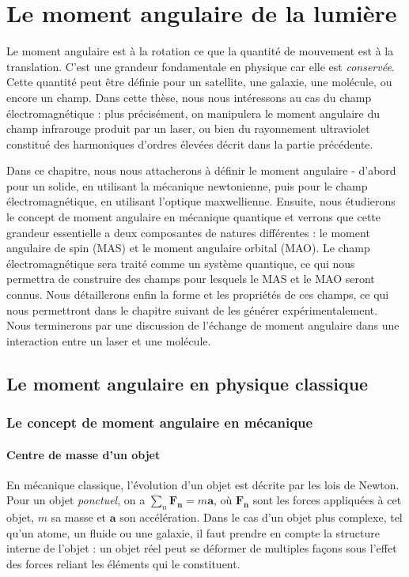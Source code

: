 \chapter{Le moment angulaire de la lumière}
\label{CH:LightAM}

Le moment angulaire est à la rotation ce que la quantité de mouvement est à la translation. C'est une grandeur fondamentale en physique car elle est \textit{conservée}. Cette quantité peut être définie pour un satellite, une galaxie, une molécule, ou encore un champ. Dans cette thèse, nous nous intéressons au cas du champ électromagnétique : plus précisément, on manipulera le moment angulaire du champ infrarouge produit par un laser, ou bien du rayonnement ultraviolet constitué des harmoniques d'ordres élevées décrit dans la partie précédente.\par
Dans ce chapitre, nous nous attacherons à définir le moment angulaire - d'abord pour un solide, en utilisant la mécanique newtonienne, puis pour le champ électromagnétique, en utilisant l'optique maxwellienne. Ensuite, nous étudierons le concept de moment angulaire en mécanique quantique et verrons que cette grandeur essentielle a deux composantes de natures différentes : le moment angulaire de spin (MAS) et le moment angulaire orbital (MAO). Le champ électromagnétique sera traité comme un système quantique, ce qui nous permettra de construire des champs pour lesquels le MAS et le MAO seront connus. Nous détaillerons enfin la forme et les propriétés de ces champs, ce qui nous permettront dans le chapitre suivant de les générer expérimentalement. Nous terminerons par une discussion de l'échange de moment angulaire dans une interaction entre un laser et une molécule.

\section{Le moment angulaire en physique classique}
\subsection{Le concept de moment angulaire en mécanique}
\subsubsection{Centre de masse d'un objet}
\label{sec:centremasse}
En mécanique classique, l'évolution d'un objet est décrite par les lois de Newton. Pour un objet \textit{ponctuel}, on a $\sum_n{\bm{F_n}}=m\bm{a}$, où $\bm{F_n}$ sont les forces appliquées à cet objet, $m$ sa masse et $\bm{a}$ son accélération. Dans le cas d'un objet plus complexe, tel qu'un atome, un fluide ou une galaxie, il faut prendre en compte la structure interne de l'objet : un objet réel peut se déformer de multiples façons sous l'effet des forces reliant les éléments qui le constituent.

